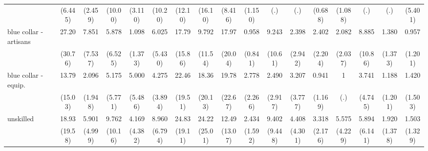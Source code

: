 {\begin{tabular}{l*{16}{c}}
                    &     (6.445)         &     (2.459)         &     (10.00)         &     (3.110)         &     (10.20)         &     (12.10)         &     (16.10)         &     (8.416)         &     (1.150)         &         (.)         &         (.)         &     (0.688)         &     (1.088)         &         (.)         &         (.)         &     (5.401)         \\
[1em]
blue collar - artisans&       27.20\sym{**} &       7.851\sym{*}  &       5.878         &       1.098         &       6.025\sym{*}  &       17.79\sym{**} &       9.792         &       17.97\sym{**} &       0.958         &       9.243         &       2.398         &       2.402         &       2.082         &       8.885         &       1.380         &       0.957         \\
                    &     (30.76)         &     (7.537)         &     (6.525)         &     (1.373)         &     (5.430)         &     (15.86)         &     (11.54)         &     (20.04)         &     (0.841)         &     (10.61)         &     (2.942)         &     (2.204)         &     (2.037)         &     (10.86)         &     (1.373)         &     (1.201)         \\
[1em]
blue collar - equip.&       13.79\sym{*}  &       2.096         &       5.175         &       5.000         &       4.275         &       22.46\sym{***}&       18.36\sym{**} &       19.78\sym{**} &       2.778         &       2.490         &       3.207         &       0.941         &           1         &       3.741         &       1.188         &       1.420         \\
                    &     (15.03)         &     (1.948)         &     (5.771)         &     (5.486)         &     (3.894)         &     (19.51)         &     (20.13)         &     (22.67)         &     (2.266)         &     (2.917)         &     (3.777)         &     (1.169)         &         (.)         &     (4.745)         &     (1.201)         &     (1.503)         \\
[1em]
unskilled           &       18.93\sym{**} &       5.901\sym{*}  &       9.762\sym{*}  &       4.169         &       8.960\sym{**} &       24.83\sym{***}&       24.22\sym{**} &       12.49\sym{*}  &       2.434         &       9.402\sym{*}  &       4.408         &       3.318         &       5.575\sym{*}  &       5.894         &       1.920         &       1.503         \\
                    &     (19.58)         &     (4.999)         &     (10.16)         &     (4.382)         &     (6.794)         &     (19.11)         &     (25.01)         &     (13.07)         &     (1.592)         &     (9.448)         &     (4.301)         &     (2.176)         &     (4.229)         &     (6.141)         &     (1.378)         &     (1.329)         \\

\end{tabular}}
